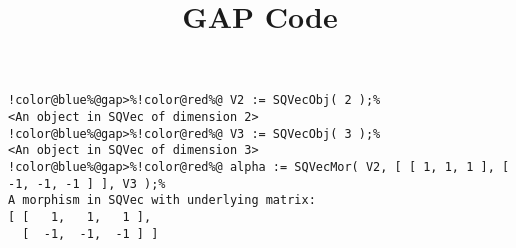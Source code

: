 \documentclass[12pt]{amsart}
\title{GAP Code}
\author{}
\begin{document}
\maketitle

\begin{Verbatim}[commandchars=!@\%,frame=single]
!color@blue%@gap>%!color@red%@ V2 := SQVecObj( 2 );%
<An object in SQVec of dimension 2>
!color@blue%@gap>%!color@red%@ V3 := SQVecObj( 3 );%
<An object in SQVec of dimension 3>
!color@blue%@gap>%!color@red%@ alpha := SQVecMor( V2, [ [ 1, 1, 1 ], [ -1, -1, -1 ] ], V3 );%
A morphism in SQVec with underlying matrix:
[ [   1,   1,   1 ],
  [  -1,  -1,  -1 ] ]

\end{Verbatim}
\end{document}
